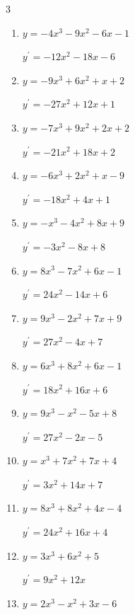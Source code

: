\begin{multicols}{3}
\begin{enumerate}
  \item $y=-4x^{3}-9x^{2}-6x-1$

        $\displaystyle y^{\prime}=-12x^{2}-18x-6$

  \item $y=-9x^{3}+6x^{2}+x+2$

        $\displaystyle y^{\prime}=-27x^{2}+12x+1$

  \item $y=-7x^{3}+9x^{2}+2x+2$

        $\displaystyle y^{\prime}=-21x^{2}+18x+2$

  \item $y=-6x^{3}+2x^{2}+x-9$

        $\displaystyle y^{\prime}=-18x^{2}+4x+1$

  \item $y=-x^{3}-4x^{2}+8x+9$

        $\displaystyle y^{\prime}=-3x^{2}-8x+8$

  \item $y=8x^{3}-7x^{2}+6x-1$

        $\displaystyle y^{\prime}=24x^{2}-14x+6$

  \item $y=9x^{3}-2x^{2}+7x+9$

        $\displaystyle y^{\prime}=27x^{2}-4x+7$

  \item $y=6x^{3}+8x^{2}+6x-1$

        $\displaystyle y^{\prime}=18x^{2}+16x+6$

  \item $y=9x^{3}-x^{2}-5x+8$

        $\displaystyle y^{\prime}=27x^{2}-2x-5$

  \item $y=x^{3}+7x^{2}+7x+4$

        $\displaystyle y^{\prime}=3x^{2}+14x+7$

  \item $y=8x^{3}+8x^{2}+4x-4$

        $\displaystyle y^{\prime}=24x^{2}+16x+4$

  \item $y=3x^{3}+6x^{2}+5$

        $\displaystyle y^{\prime}=9x^{2}+12x$

\columnbreak %

\resetques

  \item $y=2x^{3}-x^{2}+3x-6$


\end{enumerate}
\end{multicols}
